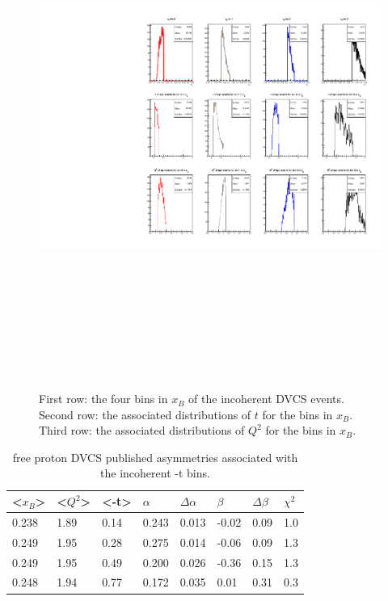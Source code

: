 \begin{figure}[h!]
   \centering
   \includegraphics[height=17.0cm]{4D-incoh-bin/4D-xB_InCoh_bins.pdf}
   \caption{ First row: the four bins in $x_B$ of the incoherent DVCS events.  
   Second row: the associated distributions of $t$ for the bins in $x_B$.    
   Third row: the associated distributions of $Q^2$ for the bins in $x_B$.}
\label{fig:incoh_xB-bins-freep}
\end{figure}



\begin {table}[!h]
\begin{center}
\begin{tabular}{|l|l|l|l|l|l|l|l|}
\hline
<$x_{B}$> & <$Q^2$> & <-t> & $\alpha$ & $\Delta \alpha$ &  $\beta$ & $\Delta 
   \beta$ & $\chi^{2}$\\
\hline
0.238  & 1.89 & 0.14 & 0.243 & 0.013 & -0.02 & 0.09 & 1.0\\
\hline
0.249  & 1.95 & 0.28 & 0.275 & 0.014 & -0.06 & 0.09 & 1.3\\
\hline
0.249  & 1.95 & 0.49 & 0.200 & 0.026 & -0.36 & 0.15 & 1.3\\
\hline
0.248  & 1.94 & 0.77 & 0.172 & 0.035 & 0.01 &  0.31 & 0.3\\
\hline
\end{tabular}
   \caption{free proton DVCS published asymmetries associated with the 
   incoherent -t bins.}
\label{Table:freeproton-t_bins}
\end{center}
\end{table}



